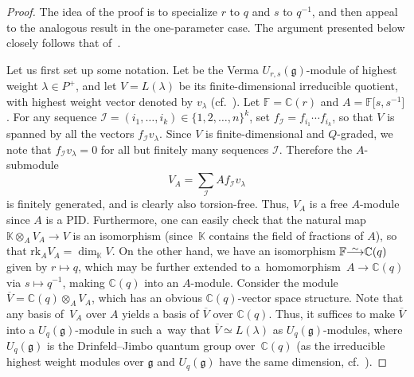 \documentclass[pdftex]{sigma}
\numberwithin{equation}{section}
\newcommand{\fg}{\mathfrak{g}}
\newcommand{\BC}{\mathbb{C}}
\newcommand{\uu}{U_{r,s}(\fg)}
\newcommand{\II}{\mathcal{I}}
\newcommand\iso{ \vphantom{j^{X^2}}\smash{\overset{\sim}{\vphantom{\rule{0pt}{0.20em}}\smash{\longrightarrow}}} }
\begin{document}
\begin{proof}
The idea of the proof is to specialize $r$ to $q$ and $s$ to $q^{-1}$, and then appeal to the analogous result in the one-parameter case. The argument presented below closely follows that of~\cite[Sections~5.12--5.15]{J}.

Let us first set up some notation. Let  be the Verma $\uu$-module of highest weight $\lambda\in P^+$, and let $V = L(\lambda)$ be its finite-dimensional irreducible quotient, with highest weight vector denoted by $v_\lambda$ (cf.\ \cite{BW2,BGH2}). Let $\mathbb{F}=\BC(r)$ and $A = \mathbb{F}\bigl[s,s^{-1}\bigr]$. For any sequence $\II = (i_{1},\dots ,i_{k})\in \{1, 2, \dots, n\}^k$, set $f_{\II} = f_{i_{1}} \cdots f_{i_{k}}$, so that $V$ is spanned by all the vectors $f_{\II}v_{\lambda}$. Since $V$ is finite-dimensional and $Q$-graded, we note that $f_{\II}v_{\lambda} = 0$ for all but finitely many sequences $\II$. Therefore the $A$-submodule
\[
 V_{A} = \sum_{\II} A f_{\II}v_{\lambda}
\]
is finitely generated, and is clearly also torsion-free. Thus, $V_{A}$ is a free $A$-module since $A$ is a PID. Furthermore, one can easily check that the natural map $\mathbb{K} \otimes_{A} V_{A} \to V$ is an isomorphism (since~$\mathbb{K}$ contains the field of fractions of $A$), so that $\mathrm{rk}_A{V_A}=\dim_{\mathbb{K}}{V}$.
On the other hand, we have an isomorphism $\mathbb{F} \iso \mathbb{C}(q)$ given by $r \mapsto q$, which may be further extended to a~homomorphism~${A \to \mathbb{C}(q)}$ via $s \mapsto q^{-1}$, making $\mathbb{C}(q)$ into an $A$-module. Consider the module $\overline{V} = \mathbb{C}(q) \otimes_{A} V_{A}$, which has an obvious $\mathbb{C}(q)$-vector space structure. Note that any basis of~$V_{A}$ over $A$ yields a basis of $\overline{V}$ over $\mathbb{C}(q)$. Thus, it suffices to make $\overline{V}$ into a $U_{q}(\mathfrak{g})$-module in such a~way that $\overline{V} \simeq L(\lambda)$ as $U_{q}(\mathfrak{g})$-modules, where $U_{q}(\mathfrak{g})$ is the Drinfeld--Jimbo quantum group over~$\mathbb{C}(q)$ (as the irreducible highest weight modules over $\fg$ and $U_q(\fg)$ have the same dimension, cf.~\cite[Theorem~5.15]{J}).


\end{proof}
\end{document}
